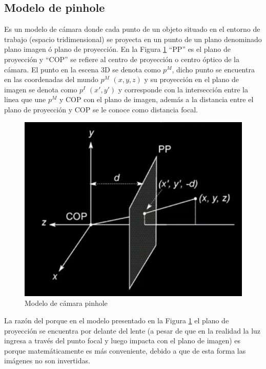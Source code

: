 \subsection{Modelo de pinhole}
Es un modelo de cámara donde cada punto de un objeto situado en el entorno de trabajo (espacio tridimensional) se proyecta en un punto de un plano denominado plano imagen ó plano de proyección. En la Figura \ref{pinholeModel} ``PP'' es el plano de proyección y ``COP'' se refiere al centro de proyección o centro óptico de la cámara. El punto en la escena 3D se denota como $p^{M}$, dicho punto se encuentra en las coordenadas del mundo $p^{M}$ $(x, y, z)$ y su proyección en el plano de imagen se denota como $p^{I}$ $(x', y')$ y corresponde con la intersección entre la linea que une $p^{M}$ y COP con el plano de imagen, además a la distancia entre el plano de proyección y COP se le conoce como distancia focal. 
\begin{figure}[H]
    \centering
    \includegraphics[scale=0.5]{Recursos/pinholeModel.jpg}
    \caption{Modelo de cámara pinhole}
    \label{pinholeModel}
\end{figure}
La razón del porque en el modelo presentado en la Figura \ref{pinholeModel} el plano de proyección se encuentra por delante del lente (a pesar de que en la realidad la luz ingresa a través del punto focal y luego impacta con el plano de imagen) es porque matemáticamente es más conveniente, debido a que de esta forma las imágenes no son invertidas.

